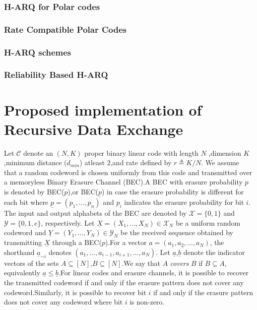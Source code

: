 \documentclass[
11pt, %
a4paper, %
oneside, %
headinclude,footinclude, %
BCOR5mm, %
]{scrartcl}
\begin{document}
\subsubsection*{H-ARQ for Polar codes}
\subsubsection*{Rate Compatible Polar Codes}
\subsubsection*{H-ARQ schemes}
\subsubsection*{Reliability Based H-ARQ}


\newpage
\section{Proposed implementation of Recursive Data Exchange} \label{propsol}

Let $\mathcal{C}$ denote an $(N, K)$ proper binary linear code with length $N$ ,dimension $K$ ,minimum distance ($d_{min}$) atleast 2,and rate defined by $r \triangleq K/N$. We assume that a random codeword is chosen uniformly from this code and transmitted over a memoryless Binary Erasure Channel (BEC).A BEC with erasure probability $p$ is denoted by BEC($p$),or BEC($\underline{p}$) in case the erasure probability is different for each bit where $\underline{p} = (p_1 , \ldots , p_n)$ and
$p_i$ indicates the erasure probability for bit $i$.
The input and output alphabets of the BEC are denoted by $\mathcal{X} = \{0, 1\}$ and $\mathcal{Y} = \{0, 1, e\}$, respectively. Let $\underline{X} = (X_1 , \ldots , X_N) \in \mathcal{X}_N$ be a uniform random codeword and
$\underline{Y} = (Y_1 , \ldots, Y_N) \in \mathcal{Y}_N$ be the received sequence obtained by transmitting $\underline{X}$ through a BEC($p$).For a vector $a = (a_1 , a_2 , \ldots , a_N)$, the shorthand $\underline{a}_{\sim i}$ denotes
$(a_1 , \ldots , a_{i-1} , a_{i+1}, \ldots , a_N)$.
Let $\underline{a}$,$\underline{b}$ denote the indicator vectors of the sets $A \subseteq [N]$,$B \subseteq [N]$.We say that $A$ \emph{covers} $B$ if $B \subseteq A$, equivalently  $\underline{a}\leq\underline{b}$.For linear codes and erasure channels, it is possible to recover the transmitted codeword if and only if the erasure
pattern does not cover any codeword.Similarly,
it is possible to recover bit $i$ if and only if the erasure
pattern does not cover any codeword where bit $i$ is non-zero.
\end{document}
